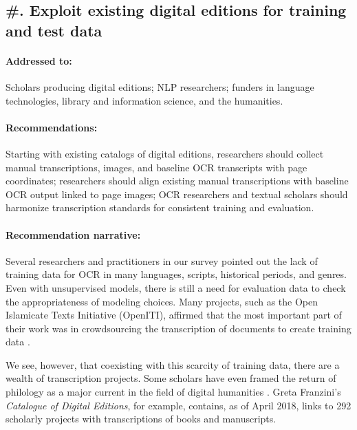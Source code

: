 \documentclass[twoside,11pt]{report}
\newcounter{reccounter}
\renewcommand{\thereccounter}{\arabic{reccounter}}
\newcommand{\recommend}[2]{\refstepcounter{reccounter}%
  \label{rec:#1}%
  \subsection{\#\thereccounter. #2}%
  \label{sec:rec-#1}}
\begin{document}
\recommend{editions}{Exploit existing digital editions for training and test data}

\paragraph{Addressed to:} Scholars producing digital editions; NLP researchers; funders in language technologies, library and information science, and the humanities.

\paragraph{Recommendations:} Starting with existing catalogs of digital editions, researchers should collect manual transcriptions, images, and baseline OCR transcripts with page coordinates; researchers should align existing manual transcriptions with baseline OCR output linked to page images; OCR researchers and textual scholars should harmonize transcription standards for consistent training and evaluation.

\paragraph{Recommendation narrative:}

Several researchers and practitioners in our survey pointed out the lack of training data for OCR in many languages, scripts, historical periods, and genres. Even with unsupervised models, there is still a need for evaluation data to check the appropriateness of modeling choices. Many projects, such as the Open Islamicate Texts Initiative (OpenITI), affirmed that the most important part of their work was in crowdsourcing the transcription of documents to create training data \citep{miller18:_digit_textual_herit_premod_islam_world}.

We see, however, that coexisting with this scarcity of training data, there are a wealth of transcription projects. Some scholars have even framed the return of philology as a major current in the field of digital humanities \citep{mcgann14:_new_repub_letter}. Greta Franzini's \citeyearpar{franzini12:_catal_digit_edition} \emph{Catalogue of Digital Editions}, for example, contains, as of April 2018, links to 292 scholarly projects with transcriptions of books and manuscripts.
\end{document}
